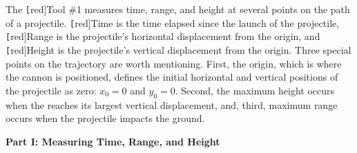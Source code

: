 \documentclass[main-physics.tex]{subfiles}
\begin{document}
The \texttt[red]{Tool \#1} measures time, range, and height at several points on the path of a projectile. \texttt[red]{Time} is the time elapsed since the launch of the projectile, \texttt[red]{Range} is the projectile's horizontal displacement from the origin, and \texttt[red]{Height} is the projectile's vertical displacement from the origin. Three special points on the trajectory are worth mentioning. First, the origin, which is where the cannon is positioned, defines the initial horizontal and vertical positions of the projectile as zero: $x_0=0$ and $y_0 = 0$. Second, the maximum height occurs when the reaches its largest vertical displacement, and, third, maximum range occurs when the projectile impacts the ground. 

\begin{center}
\end{center}

\vspace{1em}

\textbf{Part I: Measuring Time, Range, and Height}
\end{document}
